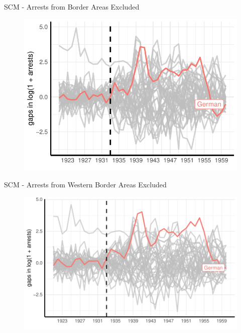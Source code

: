 \documentclass[11pt]{beamer}
\begin{document}
\begin{frame}[label=sc_non_border_area]{SCM - Arrests from Border Areas Excluded}
 \begin{figure}[h]
\centering
\includegraphics[width=1\textwidth]{placebo_highlight_all_non_border_provinces.pdf}
\end{figure}
\hyperlink{sc_robustness_checks}{}
\end{frame}


\begin{frame}[label=sc_non_border_area_west]{SCM - Arrests from Western Border Areas Excluded}
 \begin{figure}[h]
\centering
\includegraphics[width=1\textwidth]{placebo_highlight_all_non_border_provinces_western.pdf}
\end{figure}
\hyperlink{add_content}{}
\end{frame}
\end{document}
